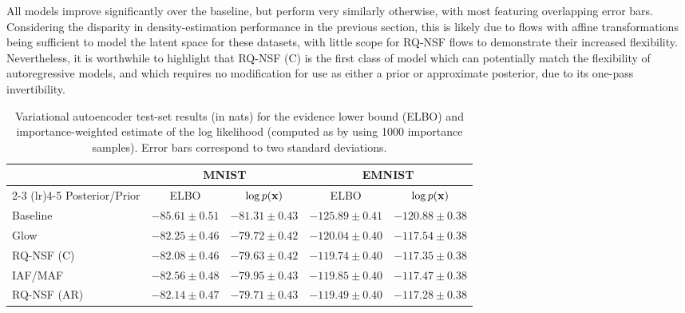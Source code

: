 All models improve significantly over the baseline, but perform very similarly otherwise, with most featuring overlapping error bars. 
Considering the disparity in density-estimation performance in the previous section, this is likely due to flows with affine transformations being sufficient to model the latent space for these datasets, with little scope for RQ-NSF flows to demonstrate their increased flexibility. 
Nevertheless, it is worthwhile to highlight that RQ-NSF (C) is the first class of model which can potentially match the flexibility of autoregressive models, and which requires no modification for use as either a prior or approximate posterior, due to its one-pass invertibility.

\begin{table}[t!]
	\caption{Variational autoencoder test-set results (in nats) for the evidence lower bound (ELBO) and importance-weighted estimate of the log likelihood (computed as by \citet{burda:2016:iwae} using 1000 importance samples). Error bars correspond to two standard deviations.}
	\label{tab:vae-results}
        \vspace*{-0.1in}
	\begin{center}
		\begin{small}
			\begin{sc}
				\begin{tabular}{lcccc}
					\toprule
					& \multicolumn{2}{c}{MNIST} & \multicolumn{2}{c}{EMNIST} \\ 
					\cmidrule(lr){2-3} \cmidrule(lr){4-5}
					Posterior/Prior & ELBO & $ \log p(\mathbf{x}) $ & ELBO & $ \log p(\mathbf{x}) $ \\
					\midrule
					Baseline & $ -85.61 \pm 0.51 $ & $ -81.31 \pm 0.43 $ & $ -125.89 \pm 0.41 $ & $ -120.88 \pm 0.38 $ \\
					\midrule
					Glow & $ -82.25 \pm 0.46 $ & $ -79.72 \pm 0.42 $ & $ -120.04 \pm 0.40 $ & $ -117.54 \pm 0.38 $ \\
					RQ-NSF (C) & $ -82.08 \pm 0.46 $ & $ -79.63 \pm 0.42 $ & $ -119.74 \pm 0.40 $ & $ -117.35 \pm 0.38 $ \\
					\midrule
					IAF/MAF & $ -82.56 \pm 0.48 $ & $ -79.95 \pm 0.43 $ & $ -119.85 \pm 0.40 $ & $ -117.47 \pm 0.38 $ \\ 
					RQ-NSF (AR) & $ -82.14 \pm 0.47 $ & $ -79.71 \pm 0.43 $ & $ -119.49 \pm 0.40 $ & $ -117.28 \pm 0.38 $ \\
					\bottomrule
				\end{tabular}
			\end{sc}
		\end{small}
	\end{center}
	\vspace{-1em}
\end{table}

